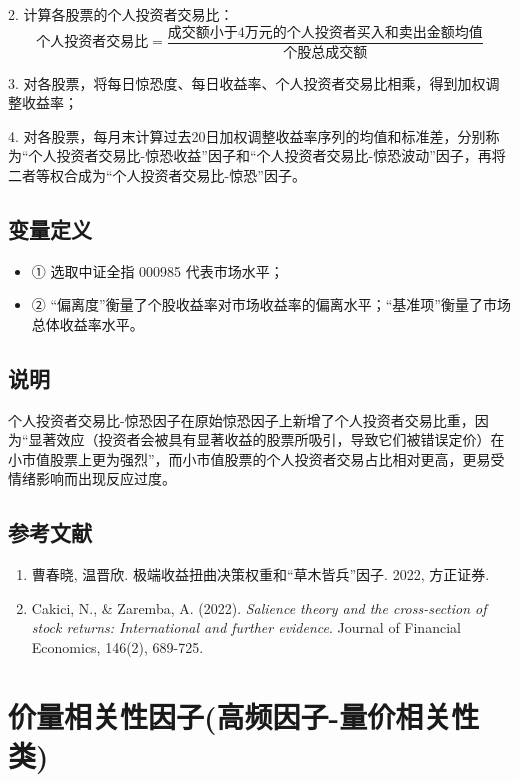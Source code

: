 \documentclass{article}
\begin{document}
2. 计算各股票的个人投资者交易比：
\begin{equation}
    \text{个人投资者交易比} = \frac{\text{成交额小于4万元的个人投资者买入和卖出金额均值}}{\text{个股总成交额}}
\end{equation}

3. 对各股票，将每日惊恐度、每日收益率、个人投资者交易比相乘，得到加权调整收益率；

4. 对各股票，每月末计算过去20日加权调整收益率序列的均值和标准差，分别称为“个人投资者交易比-惊恐收益”因子和“个人投资者交易比-惊恐波动”因子，再将二者等权合成为“个人投资者交易比-惊恐”因子。

\subsection{变量定义}
\begin{itemize}
    \item ① 选取中证全指 000985 代表市场水平；
    \item ② “偏离度”衡量了个股收益率对市场收益率的偏离水平；“基准项”衡量了市场总体收益率水平。
\end{itemize}

\subsection{说明}
个人投资者交易比-惊恐因子在原始惊恐因子上新增了个人投资者交易比重，因为“显著效应（投资者会被具有显著收益的股票所吸引，导致它们被错误定价）在小市值股票上更为强烈”，而小市值股票的个人投资者交易占比相对更高，更易受情绪影响而出现反应过度。

\subsection{参考文献}
\begin{enumerate}
    \item 曹春晓, 温晋欣. 极端收益扭曲决策权重和“草木皆兵”因子. 2022, 方正证券.
    \item Cakici, N., \& Zaremba, A. (2022). \textit{Salience theory and the cross-section of stock returns: International and further evidence}. Journal of Financial Economics, 146(2), 689-725.
\end{enumerate}

\section{价量相关性因子(高频因子-量价相关性类)}
\end{document}
